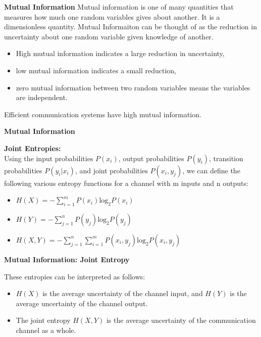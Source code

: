 

\noindent \textbf{Mutual Information}
Mutual information is one of many quantities that measures how much one random variables gives about another. It is a dimensionless quantity. Mutual Informaiton can be thought of as the reduction in uncertainty about one random variable given knowledge of another. 
\begin{itemize}\item High mutual information indicates a large reduction in uncertainty, \item low mutual information indicates a small reduction, \item  zero mutual information between two random variables means the variables are independent.
\end{itemize}
Efficient communication systems have high mutual information.


\noindent \textbf{Mutual Information}

\textbf{Joint Entropies:}\\
Using the input probabilities $P(x_i)$, output probabilities $P(y_i)$, transition probabilities $P(y_i|x_i)$,
and joint probabilities $P(x_i,y_j)$, we can define the following various entropy functions for a channel
with m inputs and n outputs:

\begin{itemize}
\item $H(X) = - \sum ^{m}_{i=1} P(x_i) \mbox{log}_2 P(x_i)$%
\item $H(Y) = - \sum ^{n}_{j=1} P(y_j) \mbox{log}_2 P(y_j)$
\item $H(X, Y)= - \sum ^{n}_{j=1}\sum ^{m}_{i=1} P(x_i,y_j) \mbox{log}_2 P(x_i,y_j)$
\end{itemize}



\noindent \textbf{Mutual Information: Joint Entropy}

These entropies can be interpreted as follows:\begin{itemize}\item $ H(X)$ is the average uncertainty of the channel input,
and $H(Y)$ is the average uncertainty of the channel output.\item  The joint entropy $H(X,Y)$ is the average uncertainty of the communication channel as a
whole.\end{itemize}

